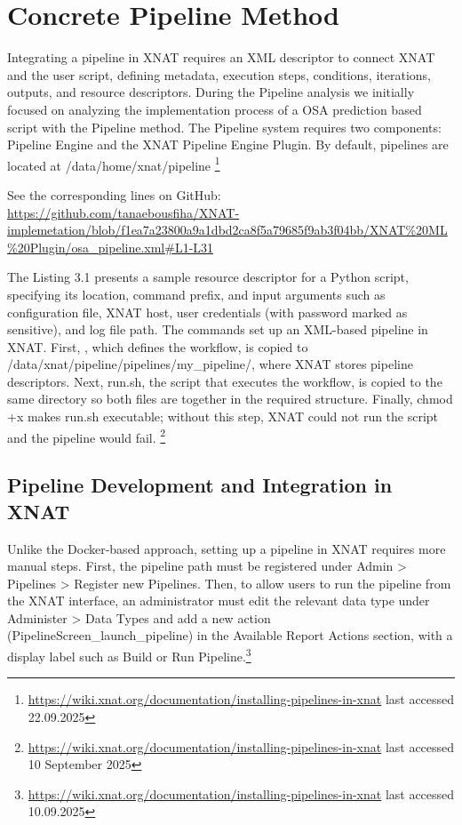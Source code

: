 
\section{Concrete Pipeline Method}

Integrating a pipeline in XNAT requires an \ac{XML} descriptor to connect XNAT and the user script, defining metadata, execution steps, conditions, iterations, outputs, and resource descriptors.
During the Pipeline analysis we initially focused on analyzing the implementation process of a OSA prediction based script with the Pipeline method. The Pipeline system requires two components: Pipeline Engine and the XNAT Pipeline Engine Plugin. By default, pipelines are located at /data/home/xnat/pipeline \footnote{\url{https://wiki.xnat.org/documentation/installing-pipelines-in-xnat} last accessed 22.09.2025}

\normalsize



\noindent\footnotesize See the corresponding lines on GitHub:\url{ https://github.com/tanaebousfiha/XNAT-implemetation/blob/f1ea7a23800a9a1dbd2ca8f5a79685f9ab3f04bb/XNAT%20ML%20Plugin/osa_pipeline.xml#L1-L31}
\normalsize

The  Listing 3.1 presents a sample resource descriptor for a Python script, specifying its location, command prefix, and input arguments such as configuration file, XNAT host, user credentials (with password marked as sensitive), and log file path. 
The commands set up an XML-based pipeline in XNAT. First, , which defines the workflow, is copied to /data/xnat/pipeline/pipelines/my\_pipeline/, where XNAT stores pipeline descriptors. Next, run.sh, the script that executes the workflow, is copied to the same directory so both files are together in the required structure. Finally, chmod +x makes run.sh executable; without this step, XNAT could not run the script and the pipeline would fail.
\footnote{\url{https://wiki.xnat.org/documentation/installing-pipelines-in-xnat} last accessed 10 September 2025}
\normalsize
\subsection{Pipeline Development and Integration in XNAT}
Unlike the Docker-based approach, setting up a pipeline in XNAT requires more manual steps. First, the pipeline path must be registered under Admin > Pipelines > Register new Pipelines. Then, to allow users to run the pipeline from the XNAT interface, an administrator must edit the relevant data type under Administer > Data Types and add a new action (PipelineScreen\_launch\_pipeline) in the Available Report Actions section, with a display label such as Build or Run Pipeline.\footnote{\url{https://wiki.xnat.org/documentation/installing-pipelines-in-xnat} last accessed 10.09.2025}
\normalsize

